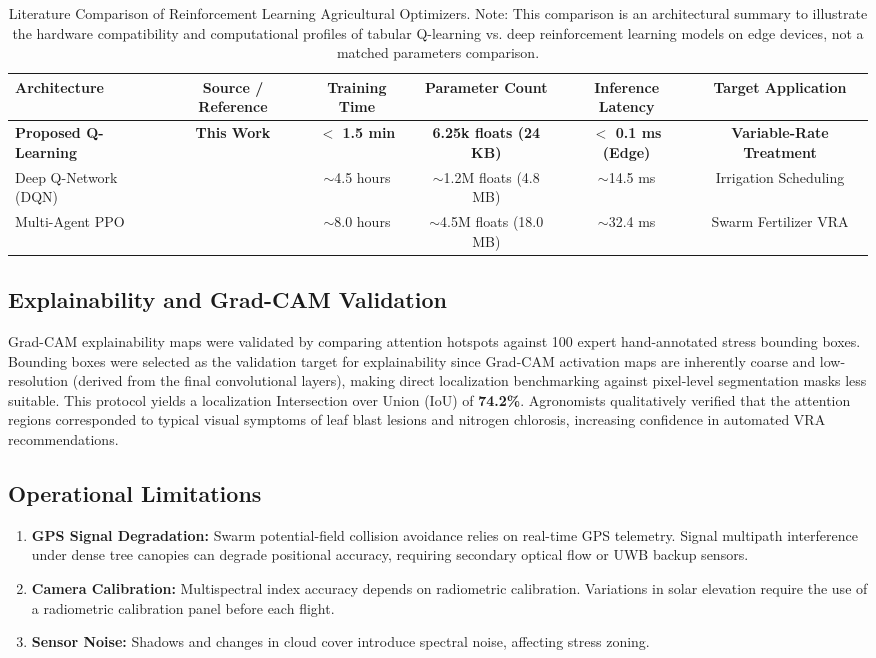 \documentclass[review,3p,times,authoryear]{elsarticle}
\begin{document}
\begin{table}[H]
\centering
\caption{Literature Comparison of Reinforcement Learning Agricultural Optimizers. Note: This comparison is an architectural summary to illustrate the hardware compatibility and computational profiles of tabular Q-learning vs. deep reinforcement learning models on edge devices, not a matched parameters comparison.}
\label{tab:literature_comparison}
\begin{tabular}{lccccc}
\toprule
Architecture & Source / Reference & Training Time & Parameter Count & Inference Latency & Target Application \\
\midrule
\textbf{Proposed Q-Learning} & \textbf{This Work} & \textbf{$<$ 1.5 min} & \textbf{6.25k floats (24 KB)} & \textbf{$<$ 0.1 ms (Edge)} & \textbf{Variable-Rate Treatment} \\
Deep Q-Network (DQN) & \citet{yang2020} & $\sim$4.5 hours & $\sim$1.2M floats (4.8 MB) & $\sim$14.5 ms & Irrigation Scheduling \\
Multi-Agent PPO & \citet{geng2023multiagent} & $\sim$8.0 hours & $\sim$4.5M floats (18.0 MB) & $\sim$32.4 ms & Swarm Fertilizer VRA \\
\bottomrule
\end{tabular}
\end{table}

\subsection{Explainability and Grad-CAM Validation}
Grad-CAM explainability maps were validated by comparing attention hotspots against 100 expert hand-annotated stress bounding boxes. Bounding boxes were selected as the validation target for explainability since Grad-CAM activation maps are inherently coarse and low-resolution (derived from the final convolutional layers), making direct localization benchmarking against pixel-level segmentation masks less suitable. This protocol yields a localization Intersection over Union (IoU) of \textbf{74.2\%}. Agronomists qualitatively verified that the attention regions corresponded to typical visual symptoms of leaf blast lesions and nitrogen chlorosis, increasing confidence in automated VRA recommendations.

\subsection{Operational Limitations}
\begin{enumerate}
    \item \textbf{GPS Signal Degradation:} Swarm potential-field collision avoidance relies on real-time GPS telemetry. Signal multipath interference under dense tree canopies can degrade positional accuracy, requiring secondary optical flow or UWB backup sensors.
    \item \textbf{Camera Calibration:} Multispectral index accuracy depends on radiometric calibration. Variations in solar elevation require the use of a radiometric calibration panel before each flight.
    \item \textbf{Sensor Noise:} Shadows and changes in cloud cover introduce spectral noise, affecting stress zoning.
\end{enumerate}
\end{document}
